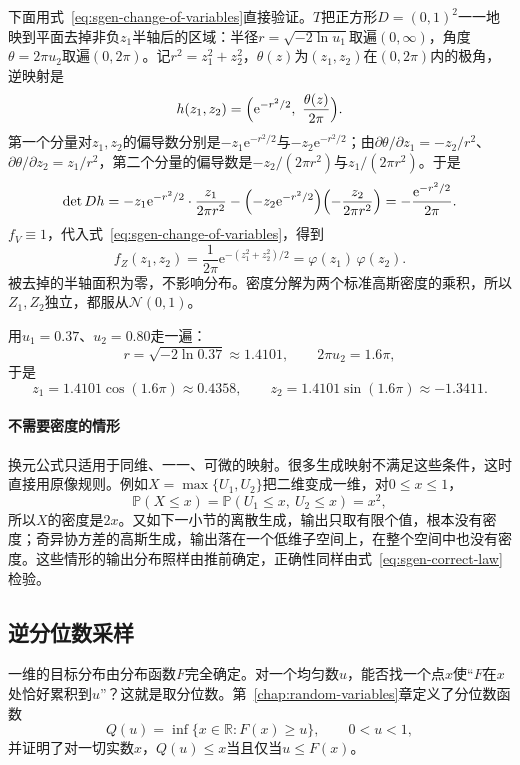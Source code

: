 下面用式~\eqref{eq:sgen-change-of-variables}直接验证。$T$把正方形$D=(0,1)^{2}$一一地映到平面去掉非负$z_1$半轴后的区域：半径$r=\sqrt{-2\ln u_1}$取遍$(0,\infty)$，角度$\theta=2\pi u_2$取遍$(0,2\pi)$。记$r^{2}=z_1^{2}+z_2^{2}$，$\theta(z)$为$(z_1,z_2)$在$(0,2\pi)$内的极角，逆映射是
\[
  h(z_1,z_2)=\Bigl(\mathrm{e}^{-r^{2}/2},\ \frac{\theta(z)}{2\pi}\Bigr).
\]
第一个分量对$z_1,z_2$的偏导数分别是$-z_1\mathrm{e}^{-r^{2}/2}$与$-z_2\mathrm{e}^{-r^{2}/2}$；由$\partial\theta/\partial z_1=-z_2/r^{2}$、$\partial\theta/\partial z_2=z_1/r^{2}$，第二个分量的偏导数是$-z_2/(2\pi r^{2})$与$z_1/(2\pi r^{2})$。于是
\[
  \det Dh=-z_1\mathrm{e}^{-r^{2}/2}\cdot\frac{z_1}{2\pi r^{2}}-\Bigl(-z_2\mathrm{e}^{-r^{2}/2}\Bigr)\Bigl(-\frac{z_2}{2\pi r^{2}}\Bigr)=-\frac{\mathrm{e}^{-r^{2}/2}}{2\pi}.
\]
$f_V\equiv1$，代入式~\eqref{eq:sgen-change-of-variables}，得到
\[
  f_Z(z_1,z_2)=\frac{1}{2\pi}\mathrm{e}^{-(z_1^{2}+z_2^{2})/2}=\varphi(z_1)\,\varphi(z_2).
\]
被去掉的半轴面积为零，不影响分布。密度分解为两个标准高斯密度的乘积，所以$Z_1,Z_2$独立，都服从$\mathcal{N}(0,1)$。

用$u_1=0.37$、$u_2=0.80$走一遍：
\[
  r=\sqrt{-2\ln0.37}\approx1.4101,\qquad 2\pi u_2=1.6\pi,
\]
于是
\[
  z_1=1.4101\cos(1.6\pi)\approx0.4358,\qquad z_2=1.4101\sin(1.6\pi)\approx-1.3411.
\]

\paragraph{不需要密度的情形}
换元公式只适用于同维、一一、可微的映射。很多生成映射不满足这些条件，这时直接用原像规则。例如$X=\max\{U_1,U_2\}$把二维变成一维，对$0\le x\le1$，
\[
  \mathbb{P}(X\le x)=\mathbb{P}(U_1\le x,\ U_2\le x)=x^{2},
\]
所以$X$的密度是$2x$。又如下一小节的离散生成，输出只取有限个值，根本没有密度；奇异协方差的高斯生成，输出落在一个低维子空间上，在整个空间中也没有密度。这些情形的输出分布照样由推前确定，正确性同样由式~\eqref{eq:sgen-correct-law}检验。

\subsection{逆分位数采样}
\label{sec:sgen-inverse}

一维的目标分布由分布函数$F$完全确定。对一个均匀数$u$，能否找一个点$x$使“$F$在$x$处恰好累积到$u$”？这就是取分位数。第~\ref{chap:random-variables}章定义了分位数函数
\begin{equation}
  Q(u)=\inf\{x\in\mathbb{R}:F(x)\ge u\},\qquad 0<u<1,
  \label{eq:sgen-quantile}
\end{equation}
并证明了对一切实数$x$，$Q(u)\le x$当且仅当$u\le F(x)$。

